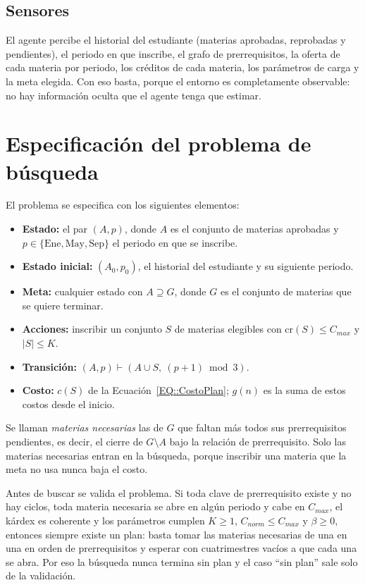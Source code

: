 \subsection{Sensores}
El agente percibe el historial del estudiante (materias aprobadas, reprobadas y pendientes), el periodo en que inscribe, el grafo de prerrequisitos, la oferta de cada materia por periodo, los créditos de cada materia, los parámetros de carga y la meta elegida. Con eso basta, porque el entorno es completamente observable: no hay información oculta que el agente tenga que estimar.

\section{Especificación del problema de búsqueda}
El problema se especifica con los siguientes elementos:
\begin{itemize}
    \item \textbf{Estado:} el par $(A, p)$, donde $A$ es el conjunto de materias aprobadas y $p \in \{\text{Ene}, \text{May}, \text{Sep}\}$ el periodo en que se inscribe.
    \item \textbf{Estado inicial:} $(A_0, p_0)$, el historial del estudiante y su siguiente periodo.
    \item \textbf{Meta:} cualquier estado con $A \supseteq G$, donde $G$ es el conjunto de materias que se quiere terminar.
    \item \textbf{Acciones:} inscribir un conjunto $S$ de materias elegibles con $\mathrm{cr}(S) \leq C_{max}$ y $|S| \leq K$.
    \item \textbf{Transición:} $(A, p) \vdash (A \cup S,\ (p + 1) \bmod 3)$.
    \item \textbf{Costo:} $c(S)$ de la Ecuación~\eqref{EQ::CostoPlan}; $g(n)$ es la suma de estos costos desde el inicio.
\end{itemize}

Se llaman \emph{materias necesarias} las de $G$ que faltan más todos sus prerrequisitos pendientes, es decir, el cierre de $G \setminus A$ bajo la relación de prerrequisito. Solo las materias necesarias entran en la búsqueda, porque inscribir una materia que la meta no usa nunca baja el costo.

Antes de buscar se valida el problema. Si toda clave de prerrequisito existe y no hay ciclos, toda materia necesaria se abre en algún periodo y cabe en $C_{max}$, el kárdex es coherente y los parámetros cumplen $K \geq 1$, $C_{norm} \leq C_{max}$ y $\beta \geq 0$, entonces siempre existe un plan: basta tomar las materias necesarias de una en una en orden de prerrequisitos y esperar con cuatrimestres vacíos a que cada una se abra. Por eso la búsqueda nunca termina sin plan y el caso ``sin plan'' sale solo de la validación.

